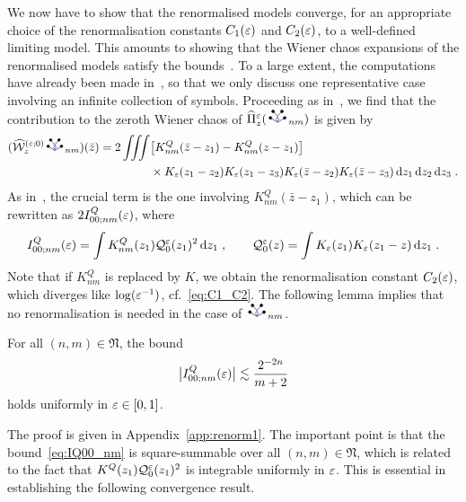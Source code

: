 \documentclass[reqno,11pt]{article}
\DeclareRobustCommand{\RobustRSoWVnm}{{\RSoWV_{nm}}}
\newcommand{\setnm}{\mathfrak{N}}
\begin{document}
We now have to show that the renormalised models converge, for an appropriate 
choice of the renormalisation constants $C_1(\varepsilon)$ and $C_2(\varepsilon)$, to a 
well-defined limiting model. This amounts to showing that the Wiener chaos 
expansions of the renormalised models satisfy the bounds~\cite[(6.20)]{BK2016}. 
To a large extent, the computations have already been made 
in~\cite[Prop.~6.4]{BK2016}, so that we only discuss one representative case 
involving an infinite collection of symbols. Proceeding as 
in~\cite[(6.39)]{BK2016}, we find that the contribution to the zeroth Wiener 
chaos of $\widehat\Pi^\eps_z(\RSoWV_{nm})$ is given by 
\begin{align}
 (\widehat\cW^{(\eps;0)}_z \RSoWV_{nm})(\bar z)
 = 2\iiint &\bigbrak{K^Q_{nm}(\bar z-z_1) - K^Q_{nm}(z-z_1)} \\
 &\times K_\eps(z_1-z_2) K_\eps(z_1-z_3) K_\eps(\bar z-z_2) K_\eps(\bar z-z_3) 
 \6z_1 \6z_2 \6z_3\;.
 \nonumber
\end{align} 
As in~\cite[Prop.~6.4]{BK2016}, the crucial term is the one involving 
$K^Q_{nm}(\bar z-z_1)$, which can be rewritten as $2I^Q_{00;nm}(\varepsilon)$, 
where  
\begin{equation}
 I^Q_{00;nm}(\varepsilon) = \int K^Q_{nm}(z_1) {\mathcal Q}^\varepsilon_0(z_1)^2 \operatorname{d}\!z_1\;, 
 \qquad 
 {\mathcal Q}^\varepsilon_0(z) = \int K_\varepsilon(z_1) K_\varepsilon(z_1-z)\operatorname{d}\!z_1\;.
\end{equation} 
Note that if $K^Q_{nm}$ is replaced by $K$, we obtain the 
renormalisation constant $C_2(\varepsilon)$, which diverges like $\log(\varepsilon^{-1})$, 
cf.~\eqref{eq:C1_C2}. The following lemma implies that no renormalisation is 
needed in the case of $\RobustRSoWVnm$. 

\begin{lemma}
\label{lem:I00} 
For all $(n,m) \in \setnm$, the bound
\begin{equation}
\label{eq:IQ00_nm} 
 \bigabs{I^Q_{00;nm}(\eps)} 
 \lesssim \frac{2^{-2n}}{m+2}
\end{equation}
holds uniformly in $\varepsilon\in[0,1]$. 
\end{lemma}

The proof is given in Appendix~\ref{app:renorm1}. The important point is that 
the bound~\eqref{eq:IQ00_nm} is square-summable over all $(n,m)\in\setnm$, which 
is related to the fact that $K^Q(z_1) {\mathcal Q}^\varepsilon_0(z_1)^2$ is integrable uniformly 
in $\varepsilon$. This is essential in establishing the following convergence result.
\end{document}
